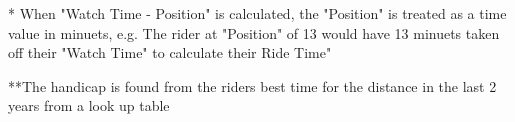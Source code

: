 * When "Watch Time - Position" is calculated, the "Position" is treated as a time value in minuets, e.g. The rider at "Position" of 13 would have 13 minuets taken off their "Watch Time" to calculate their Ride Time"

\begin{algorithm}[H]
\label{fig:Time Sort Algorithm}
	\caption{$Time Sort Algorithm$}
\begin{algorithmic}[2]
		\EndIf
	\EndFor
\EndWhile
\end{algorithmic}
\end{algorithm}

\begin{algorithm}[H]
\label{fig:Handicap Time Algorithm}
	\caption{$Handicap Time Algorithm$}
\begin{algorithmic}[3]
\end{algorithmic}
\end{algorithm}

**The handicap is found from the riders best time for the distance in the last 2 years from a look up table
